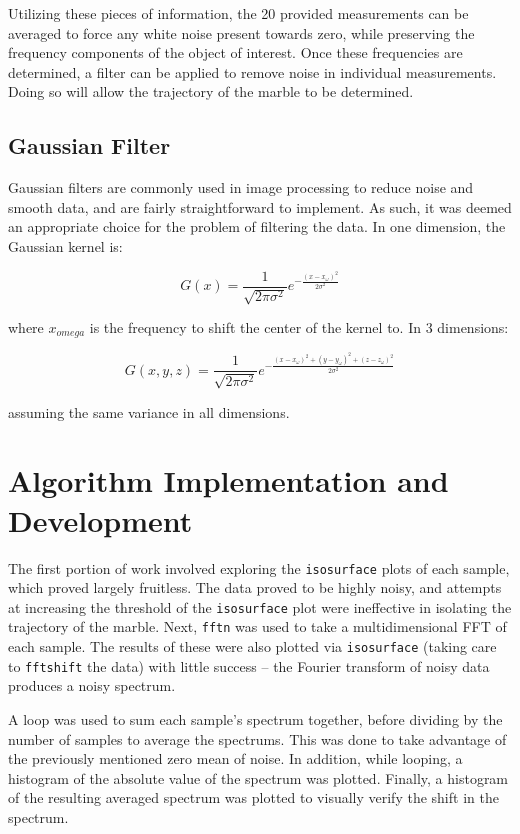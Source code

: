 \documentclass[journal]{IEEEtran}
\def\code#1{\texttt{#1}}
\begin{document}
Utilizing these pieces of information, the 20 provided measurements can be averaged to force any white noise present towards zero, while preserving the frequency components of the object of interest. Once these frequencies are determined, a filter can be applied to remove noise in individual measurements. Doing so will allow the trajectory of the marble to be determined.

\subsection{Gaussian Filter}
Gaussian filters are commonly used in image processing to reduce noise and smooth data, and are fairly straightforward to implement. As such, it was deemed an appropriate choice for the problem of filtering the data. In one dimension, the Gaussian kernel is:

\begin{equation}
G(x)=\frac{1}{\sqrt{2\pi\sigma^2}}e^{-\frac{(x-x_{\omega})^2}{2\sigma^2}}
\end{equation}

where $x_{omega}$ is the frequency to shift the center of the kernel to. In 3 dimensions:

\begin{equation}
G(x,y,z)=\frac{1}{\sqrt{2\pi\sigma^2}}e^{-\frac{(x-x_{\omega})^2+(y-y_{\omega})^2+(z-z_{\omega})^2}{2\sigma^2}}
\end{equation}

assuming the same variance in all dimensions.

\section{Algorithm Implementation and Development}
The first portion of work involved exploring the \code{isosurface} plots of each sample, which proved largely fruitless. The data proved to be highly noisy, and attempts at increasing the threshold of the \code{isosurface} plot were ineffective in isolating the trajectory of the marble. Next, \code{fftn} was used to take a multidimensional FFT of each sample. The results of these were also plotted via \code{isosurface} (taking care to \code{fftshift} the data) with little success -- the Fourier transform of noisy data produces a noisy spectrum.


A loop was used to sum each sample's spectrum together, before dividing by the number of samples to average the spectrums. This was done to take advantage of the previously mentioned zero mean of noise. In addition, while looping, a histogram of the absolute value of the spectrum was plotted. Finally, a histogram of the resulting averaged spectrum was plotted to visually verify the shift in the spectrum.
\end{document}
